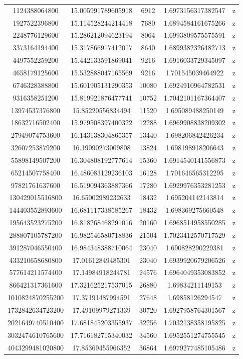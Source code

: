 \documentclass{article}
\begin{document}
\begin{center}
\begin{tabular}{ |c|c|c|c|c| }
1124388064800 & 15.005991789605918 & 6912 & 1.6973156317382547	& z\\
1927522396800 &  15.114528244214418 & 7680 & 1.6894584161675266 & z\\	
2248776129600 &	15.286212094623194 &	 8064& 1.6993809575575591 & z\\
3373164194400 & 15.317866917412017 & 8640 & 1.6899382326482713 & z \\
4497552259200 & 15.442133591869041 & 9216 & 1.6916033729345097 & z\\	
4658179125600 & 15.532888047165569 & 9216 & 1.701545039464922 & z\\
6746328388800 &  15.601905131290353 & 10080 &  1.6924910964782531 & z\\
9316358251200 &	 15.819921876477741	& 10752 & 1.7042101167364407 & z\\
13974537376800 & 15.85220556834494	& 11520	&  1.695089488250149 & z\\
18632716502400 & 15.979508397400322	& 12288	& 1.6969908838209302 & z\\ 27949074753600 & 16.143138304865357	&  13440 & 1.698206842426234 & z\\
32607253879200 &  16.19090273009808 & 13824 & 1.698198918206643 & z\\	
55898149507200 & 16.304808192777614	&  15360 & 1.6914540141556873 & z\\	
65214507758400 & 16.486083129236103 & 16128	&  1.701646565312295 & z\\
97821761637600 &  16.519094363887366 &	17280 & 1.6929976353281253 & z\\
130429015516800	& 16.65002989232633 & 18432 &  1.695204142143814 & z\\
144403552893600	& 16.681117338585267 & 18432 & 1.698369275660548 & z\\
195643523275200	& 16.818268468291016 &	20160 & 1.6968514958550285 & z\\
288807105787200	& 16.982546580718836 & 21504 & 1.7023412570717529 & z\\
391287046550400	& 16.984348388710064 & 23040 &  1.690828290229381 & z\\
433210658680800	& 17.01612849485301	& 23040	& 1.6939920679206526 & z\\
577614211574400	& 17.14984918244781	& 24576	& 1.6964049353083852 & z\\
866421317361600	& 17.321625217537015 & 26880 &1.69834211149153 & z\\
1010824870255200 & 17.37191487994591 & 27648 & 1.69858126294547	&z\\ 
1732842634723200 & 17.49109979271339 & 30720 &1.6927958764301567 & z\\
2021649740510400 & 17.681845203355937 & 32256 & 1.7032138358195825 &z\\
3032474610765600 & 17.716182715340032 & 34560 & 1.6952551274755545 &z\\
4043299481020800 &	17.85369455966352 &  36864 & 1.6979277485105486 & z\\
\hline
\end{tabular}
\end{center}
\end{document}
